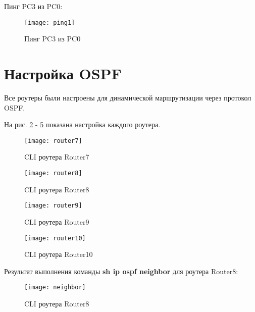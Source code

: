 \documentclass[a4paper, 14pt]{article}
\begin{document}
Пинг PC3 из PC0:

\begin{figure}[H]
	\begin{center} 
    \texttt{[image: ping1]}
    \caption{Пинг PC3 из PC0}
    \label{fig:2}
    \end{center}
\end{figure}

\newpage
\section*{Настройка OSPF}

Все роутеры были настроены для динамической маршрутизации через протокол OSPF.

На рис. \ref{fig:3} -  \ref{fig:6} показана настройка каждого роутера.

\begin{figure}[H]
	\begin{center} 
    \texttt{[image: router7]}
    \caption{CLI роутера Router7}
    \label{fig:3}
    \end{center}
\end{figure}

\begin{figure}[H]
	\begin{center} 
    \texttt{[image: router8]}
    \caption{CLI роутера Router8}
    \label{fig:4}
    \end{center}
\end{figure}

\begin{figure}[H]
	\begin{center} 
    \texttt{[image: router9]}
    \caption{CLI роутера Router9}
    \label{fig:5}
    \end{center}
\end{figure}

\begin{figure}[H]
	\begin{center} 
    \texttt{[image: router10]}
    \caption{CLI роутера Router10}
    \label{fig:6}
    \end{center}
\end{figure}

\newpage

Результат выполнения команды \textbf{sh ip ospf neighbor} для роутера Router8:


\begin{figure}[H]
	\begin{center} 
    \texttt{[image: neighbor]}
    \caption{CLI роутера Router8}
    \label{fig:7}
    \end{center}
\end{figure}
\end{document}
